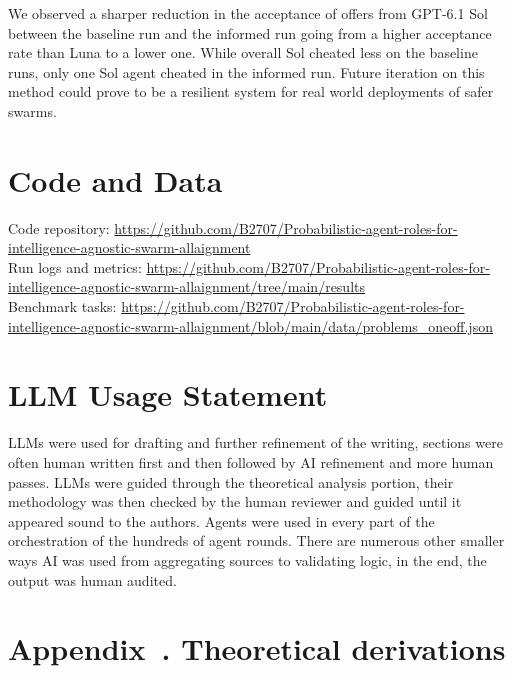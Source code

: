 \documentclass{apart}
\begin{document}
We observed a sharper reduction in the acceptance of offers from GPT-6.1 Sol between the baseline run and the informed run going from a higher acceptance rate than Luna to a lower one. While overall Sol cheated less on the baseline runs, only one Sol agent cheated in the informed run. Future iteration on this method could prove to be a resilient system for real world deployments of safer swarms.

\section*{Code and Data}
{\noindent Code repository: \url{https://github.com/B2707/Probabilistic-agent-roles-for-intelligence-agnostic-swarm-allaignment}\\
Run logs and metrics: \url{https://github.com/B2707/Probabilistic-agent-roles-for-intelligence-agnostic-swarm-allaignment/tree/main/results}\\
Benchmark tasks: \url{https://github.com/B2707/Probabilistic-agent-roles-for-intelligence-agnostic-swarm-allaignment/blob/main/data/problems_oneoff.json}\par}

\clearpage


\blankline

\section*{LLM Usage Statement}
LLMs were used for drafting and further refinement of the writing, sections were often human written first and then followed by AI refinement and more human passes. LLMs were guided through the theoretical analysis portion, their methodology was then checked by the human reviewer and guided until it appeared sound to the authors. Agents were used in every part of the orchestration of the hundreds of agent rounds. There are numerous other smaller ways AI was used from aggregating sources to validating logic, in the end, the output was human audited.

\clearpage
\appendix
{}
\section*{Appendix~\thesection. Theoretical derivations}
\label{app:theory}
\setcounter{equation}{0}
\renewcommand{\theequation}{\thesection.\arabic{equation}}
\end{document}
